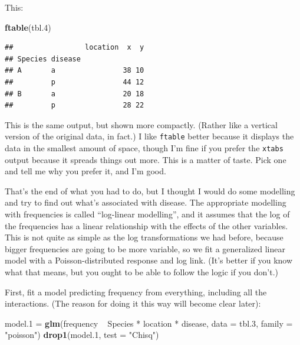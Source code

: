 \documentclass[]{tufte-book}
\newenvironment{Shaded}{}{}
\newcommand{\DataTypeTok}[1]{\textcolor[rgb]{0.56,0.13,0.00}{#1}}
\newcommand{\FloatTok}[1]{\textcolor[rgb]{0.25,0.63,0.44}{#1}}
\newcommand{\KeywordTok}[1]{\textcolor[rgb]{0.00,0.44,0.13}{\textbf{#1}}}
\newcommand{\NormalTok}[1]{#1}
\newcommand{\OperatorTok}[1]{\textcolor[rgb]{0.40,0.40,0.40}{#1}}
\newcommand{\StringTok}[1]{\textcolor[rgb]{0.25,0.44,0.63}{#1}}
\theoremstyle{definition}
\theoremstyle{definition}
\theoremstyle{definition}
\theoremstyle{remark}
\begin{document}
This:

\begin{Shaded}
\begin{Highlighting}[]
\KeywordTok{ftable}\NormalTok{(tbl}\FloatTok{.4}\NormalTok{)}
\end{Highlighting}
\end{Shaded}

\begin{verbatim}
##                 location  x  y
## Species disease               
## A       a                38 10
##         p                44 12
## B       a                20 18
##         p                28 22
\end{verbatim}

This is the same output, but shown more compactly. (Rather like a
vertical version of the original data, in fact.) I like \texttt{ftable}
better because it displays the data in the smallest amount of space,
though I'm fine if you prefer the \texttt{xtabs} output because it
spreads things out more. This is a matter of taste. Pick one and tell me
why you prefer it, and I'm good.

That's the end of what you had to do, but I thought I would do some
modelling and try to find out what's associated with disease. The
appropriate modelling with frequencies is called ``log-linear
modelling'', and it assumes that the log of the frequencies has a linear
relationship with the effects of the other variables. This is not quite
as simple as the log transformations we had before, because bigger
frequencies are going to be more variable, so we fit a generalized
linear model with a Poisson-distributed response and log link. (It's
better if you know what that means, but you ought to be able to follow
the logic if you don't.)

First, fit a model predicting frequency from everything, including all
the interactions. (The reason for doing it this way will become clear
later):

\begin{Shaded}
\begin{Highlighting}[]
\NormalTok{model}\FloatTok{.1}\NormalTok{ =}\StringTok{ }\KeywordTok{glm}\NormalTok{(frequency }\OperatorTok{~}\StringTok{ }\NormalTok{Species }\OperatorTok{*}\StringTok{ }\NormalTok{location }\OperatorTok{*}\StringTok{ }
\StringTok{    }\NormalTok{disease, }\DataTypeTok{data =}\NormalTok{ tbl}\FloatTok{.3}\NormalTok{, }\DataTypeTok{family =} \StringTok{"poisson"}\NormalTok{)}
\KeywordTok{drop1}\NormalTok{(model}\FloatTok{.1}\NormalTok{, }\DataTypeTok{test =} \StringTok{"Chisq"}\NormalTok{)}
\end{Highlighting}
\end{Shaded}
\end{document}
